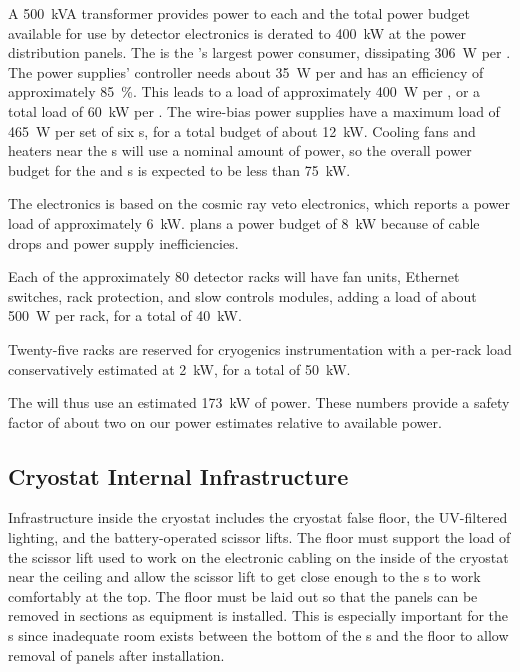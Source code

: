 A \SI{500}{kVA} transformer provides power to each  and the total power budget available for use by detector electronics is derated to \SI{400}{kW} at the power distribution panels.  
The  is the 's largest power consumer,  dissipating \SI{306}{W} per .  
The  power supplies' controller needs about \SI{35}{W} per  and has an efficiency of approximately \SI{85}{\%}. 
This leads to a load of  approximately  \SI{400}{W}  per , or a total load of  \SI{60}{kW} per .  
The  wire-bias power supplies have a maximum load of  \SI{465}{W} per set of six s, for a total budget of about   \SI{12}{kW}.   
Cooling fans and heaters near the \fdth{}s will use a nominal amount of power, so the overall power budget for the  and  s is expected to be less than \SI{75}{kW}.


The  electronics is based on the  cosmic ray veto electronics, which reports a power load of approximately  \SI{6}{kW}.   plans a power budget of  \SI{8}{kW} because of cable drops and  power supply inefficiencies.  

Each of the approximately 80 detector racks will have fan units, Ethernet switches, rack protection, and slow controls modules, adding a load of about \SI{500}{W} per rack, for a total of \SI{40}{kW}.

Twenty-five racks are reserved for cryogenics instrumentation with a per-rack load conservatively estimated at \SI{2}{kW}, for a total of \SI{50}{kW}. 

The  will thus use  an estimated \SI{173}{kW} of power.   These numbers provide a safety factor of about two on our power estimates relative to available power.


\subsection{Cryostat Internal Infrastructure}
\label{sec:fdsp-tc-infr-cryo-int}



Infrastructure inside the cryostat includes the cryostat false floor, the UV-filtered lighting, and the battery-operated scissor lifts. 
The floor must support the load of the scissor lift used to work on the electronic cabling on the inside of the cryostat near the ceiling and allow the scissor lift to get close enough to the s to work comfortably at the top. 
The floor  must be laid out so that the panels can be removed in sections as equipment is installed. 
This is especially important for the s since inadequate room exists between the bottom of the s and the floor to allow removal of panels after installation. 


